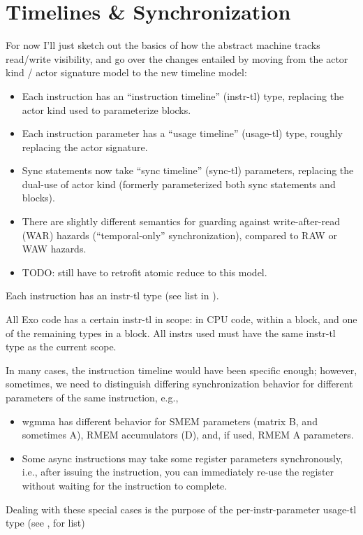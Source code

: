 \newpage
\section{Timelines \& Synchronization}
\label{ch:Timelines}

For now I'll just sketch out the basics of how the abstract machine tracks read/write visibility, and go over the changes entailed by moving from the actor kind / actor signature model to the new timeline model:
\begin{itemize}
  \item Each instruction has an ``instruction timeline'' (instr-tl) type, replacing the actor kind used to parameterize  blocks.
  \filbreak
  \item Each instruction parameter has a ``usage timeline'' (usage-tl) type, roughly replacing the actor signature.
  \filbreak
  \item Sync statements now take ``sync timeline'' (sync-tl) parameters, replacing the dual-use of actor kind (formerly parameterized both sync statements and  blocks).
  \filbreak
  \item There are slightly different semantics for guarding against write-after-read (WAR) hazards (``temporal-only'' synchronization), compared to RAW or WAW hazards.
  \filbreak
  \item TODO: still have to retrofit atomic reduce to this model.
\end{itemize}

\filbreak
{}

Each instruction has an instr-tl type (see list in ).

\filbreak
All Exo code has a certain instr-tl in scope:  in CPU code,  within a  block, and one of the remaining types in a  block.
All instrs used must have the same instr-tl type as the current scope.

\filbreak
{}

In many cases, the instruction timeline would have been specific enough; however, sometimes, we need to distinguish differing synchronization behavior for different parameters of the same instruction, e.g.,
\begin{itemize}
  \item wgmma has different behavior for SMEM parameters (matrix B, and sometimes A), RMEM accumulators (D), and, if used, RMEM A parameters.
  \filbreak
  \item Some async instructions may take some register parameters synchronously, i.e., after issuing the instruction, you can immediately re-use the register without waiting for the instruction to complete.
\end{itemize}
\filbreak
Dealing with these special cases is the purpose of the per-instr-parameter usage-tl type (see , for list)

